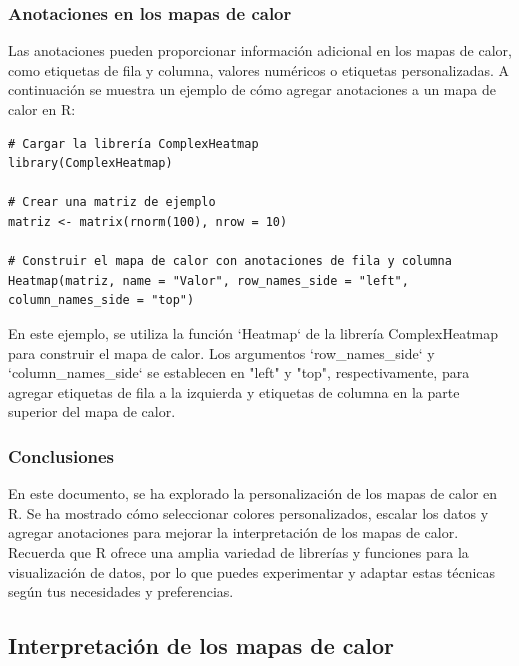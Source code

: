 \documentclass{article}
\begin{document}
\subsubsection{Anotaciones en los mapas de calor}
Las anotaciones pueden proporcionar información adicional en los mapas de calor, como etiquetas de fila y columna, valores numéricos o etiquetas personalizadas. A continuación se muestra un ejemplo de cómo agregar anotaciones a un mapa de calor en R:

\begin{verbatim}
# Cargar la librería ComplexHeatmap
library(ComplexHeatmap)

# Crear una matriz de ejemplo
matriz <- matrix(rnorm(100), nrow = 10)

# Construir el mapa de calor con anotaciones de fila y columna
Heatmap(matriz, name = "Valor", row_names_side = "left", column_names_side = "top")
\end{verbatim}

En este ejemplo, se utiliza la función `Heatmap` de la librería ComplexHeatmap para construir el mapa de calor. Los argumentos `row\_names\_side` y `column\_names\_side` se establecen en "left" y "top", respectivamente, para agregar etiquetas de fila a la izquierda y etiquetas de columna en la parte superior del mapa de calor.

\subsubsection*{Conclusiones}
En este documento, se ha explorado la personalización de los mapas de calor en R. Se ha mostrado cómo seleccionar colores personalizados, escalar los datos y agregar anotaciones para mejorar la interpretación de los mapas de calor. Recuerda que R ofrece una amplia variedad de librerías y funciones para la visualización de datos, por lo que puedes experimentar y adaptar estas técnicas según tus necesidades y preferencias.


\subsection{Interpretación de los mapas de calor }
\end{document}
